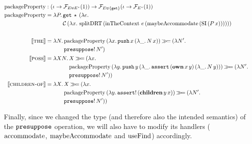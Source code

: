 \begin{align*}
  \mathrm{packageProperty} &: (\iota \to \mathcal{F}_{E \uplus E^*}(1))
                  \to \mathcal{F}_{E \uplus \{\mathtt{get}\}}(\iota \to \mathcal{F}_{E^*}(1)) \\
  \mathrm{packageProperty} &= \lambda P.\, \begin{aligned}[t]
      &\mathtt{get}\,\star\,(\lambda e.\,  \\
      &\mathcal{C}\,(\lambda x.\, \operatorname{splitDRT}\,(\operatorname{inTheContext}\,e\,(\operatorname{maybeAccommodate}\,(\operatorname{SI}\,(P\,x))))))
    \end{aligned} \\
  \\
  \llbracket \textsc{the} \rrbracket &= \lambda N.\, \begin{aligned}[t]
      &\mathrm{packageProperty}\,(\lambda x.\, \mathtt{push}\,x\,(\lambda \_.\, N\,x)) \mathbin{\gg\!=} (\lambda N'.\,  \\
      &\mathtt{presuppose}!\,N')
    \end{aligned} \\
  \llbracket \textsc{poss} \rrbracket &= \lambda X N.\, \begin{aligned}[t]
      &X \mathbin{\gg\!=} (\lambda x.\,  \\
      &\mathrm{packageProperty}\,(\lambda y.\, \mathtt{push}\,y\,(\lambda \_.\, \mathtt{assert}\,(\textbf{own}\,x\,y)\,(\lambda \_.\, N\,y))) \mathbin{\gg\!=} (\lambda N'.\,  \\
      &\mathtt{presuppose}!\,N'))
    \end{aligned} \\
  \llbracket \textsc{children-of} \rrbracket &= \lambda X.\, \begin{aligned}[t]
      &X \mathbin{\gg\!=} (\lambda x.\,  \\
      &\mathrm{packageProperty}\,(\lambda y.\, \mathtt{assert}!\,(\textbf{children}\,y\,x)) \mathbin{\gg\!=} (\lambda N'.\,  \\
      &\mathtt{presuppose}!\,N'))
    \end{aligned}
\end{align*}

Finally, since we changed the type (and therefore also the intended
semantics) of the $\mathtt{presuppose}$ operation, we will also have to modify
its handlers ($\operatorname{accommodate}$, $\operatorname{maybeAccommodate}$ and $\operatorname{useFind}$)
accordingly.

